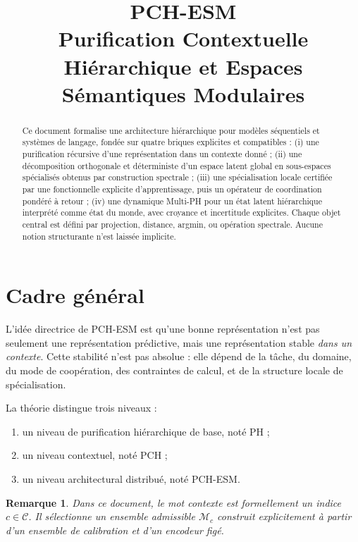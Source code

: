 \documentclass[11pt,a4paper]{article}
\title{PCH-ESM\\
\large Purification Contextuelle Hiérarchique et Espaces Sémantiques Modulaires}
\author{}
\date{}
\newtheorem{remark}{Remarque}[section]
\newcommand{\C}{\mathcal C}
\newcommand{\Mcal}{\mathcal M}
\newcommand{\1}{\mathbf 1}
\begin{document}
\maketitle

\begin{abstract}
Ce document formalise une architecture hiérarchique pour modèles séquentiels et systèmes de langage, fondée sur quatre briques explicites et compatibles :
(i) une purification récursive d'une représentation dans un contexte donné ;
(ii) une décomposition orthogonale et déterministe d'un espace latent global en sous-espaces spécialisés obtenus par construction spectrale ;
(iii) une spécialisation locale certifiée par une fonctionnelle explicite d'apprentissage, puis un opérateur de coordination pondéré à retour ;
(iv) une dynamique Multi-PH pour un état latent hiérarchique interprété comme état du monde, avec croyance et incertitude explicites.
Chaque objet central est défini par projection, distance, argmin, ou opération spectrale. Aucune notion structurante n'est laissée implicite.
\end{abstract}

\tableofcontents

\section{Cadre général}

L'idée directrice de PCH-ESM est qu'une bonne représentation n'est pas seulement une représentation prédictive, mais une représentation stable \emph{dans un contexte}.  
Cette stabilité n'est pas absolue : elle dépend de la tâche, du domaine, du mode de coopération, des contraintes de calcul, et de la structure locale de spécialisation.

La théorie distingue trois niveaux :

\begin{enumerate}[leftmargin=2em]
    \item un niveau de purification hiérarchique de base, noté PH ;
    \item un niveau contextuel, noté PCH ;
    \item un niveau architectural distribué, noté PCH-ESM.
\end{enumerate}

\begin{remark}
Dans ce document, le mot \emph{contexte} est formellement un indice \(c\in\C\).  
Il sélectionne un ensemble admissible \(\Mcal_c\) construit explicitement à partir d'un ensemble de calibration et d'un encodeur figé.
\end{remark}
\end{document}
